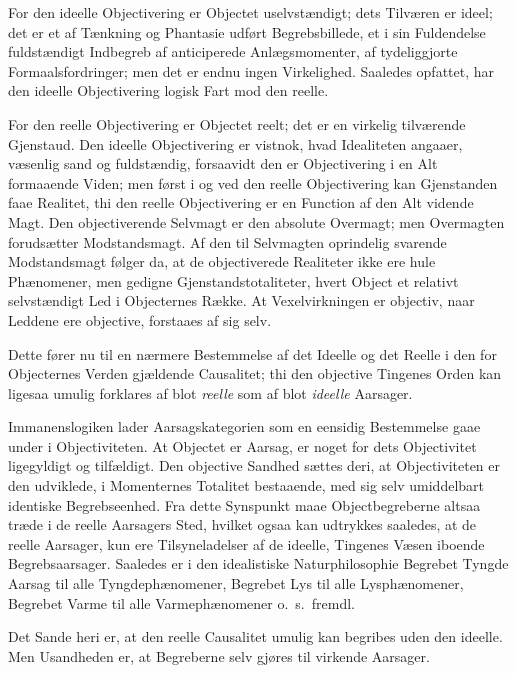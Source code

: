\documentclass[12pt]{book}
\newcommand{\opage}[1]{\marginnote{\footnotesize\textit{[#1]}}}
\begin{document}
For den ideelle Objectivering er Objectet uselvstændigt; dets
Tilværen er ideel; det er et af Tænkning og Phantasie udført
Begrebsbillede, et i sin Fuldendelse fuldstændigt Indbegreb af
anticiperede Anlægsmomenter, af tydeliggjorte Formaalsfordringer;
men det er endnu ingen Virkelighed. Saaledes opfattet, har den
ideelle Objectivering logisk Fart mod den reelle.

For den reelle Objectivering er Objectet reelt; det er en virkelig
tilværende Gjenstaud. Den ideelle Objectivering er vistnok, hvad
Idealiteten angaaer, væsenlig sand og fuldstændig, forsaavidt den er
Objectivering i en Alt formaaende Viden; men først i og ved den
reelle Objectivering kan Gjenstanden faae Realitet, thi den reelle
Objectivering er en Function af den Alt vidende Magt. Den
objectiverende Selvmagt er den absolute Overmagt; men Overmagten
forudsætter Modstandsmagt. Af den til Selvmagten oprindelig svarende
Modstandsmagt følger da, at de objectiverede Realiteter ikke ere
hule Phænomener, men gedigne Gjenstandstotaliteter, hvert Object et
relativt selvstændigt Led i Objecternes Række. At Vexelvirkningen er
objectiv, naar Leddene ere objective, forstaaes af sig selv.

Dette fører nu til en nærmere Bestemmelse af det Ideelle og det
Reelle i den for Objecternes Verden gjældende Causalitet; thi den
objective Tingenes Orden kan ligesaa umulig forklares af blot
\emph{reelle} som af blot \emph{ideelle} Aarsager.

Immanenslogiken lader Aarsagskategorien som en eensidig Bestemmelse
gaae under i Objectiviteten. At Objectet er Aarsag, er noget for
dets Objectivitet ligegyldigt og tilfældigt. Den objective Sandhed
sættes deri, at Objectiviteten er den udviklede, i Momenternes
Totalitet bestaaende, med sig selv umiddelbart identiske
Begrebseenhed. Fra dette Synspunkt maae Objectbegreberne altsaa
træde i de reelle
\opage{76} Aarsagers Sted, hvilket ogsaa kan udtrykkes saaledes, at de reelle
Aarsager, kun ere Tilsyneladelser af de ideelle, Tingenes Væsen
iboende Begrebsaarsager. Saaledes er i den idealistiske
Naturphilosophie Begrebet Tyngde Aarsag til alle Tyngdephænomener,
Begrebet Lys til alle Lysphænomener, Begrebet Varme til alle
Varmephænomener o.~s.~fremdl.

Det Sande heri er, at den reelle Causalitet umulig kan begribes uden
den ideelle. Men Usandheden er, at Begreberne selv gjøres til
virkende Aarsager.
\end{document}

